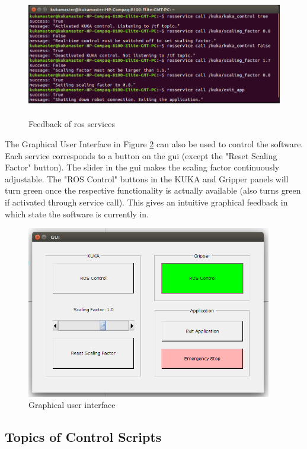 \documentclass[headsepline,footinclude=false,fontsize=11pt,paper=a4,listof=totoc,bibliography=totoc,BCOR=12mm,DIV=14]{scrbook}
\begin{document}
\begin{figure}[h]
    \centering
    \includegraphics[height=5.5cm]{figures/services}
    \caption{Feedback of \gls{ros} services}
    \label{fig:services}
\end{figure}

The Graphical User Interface in Figure \ref{fig:gui} can also be used to control the software. Each service corresponds to a button on the \gls{gui} (except the "Reset Scaling Factor" button). The slider in the \gls{gui} makes the scaling factor continuously adjustable. The "ROS Control" buttons in the KUKA and Gripper panels will turn green once the respective functionality is actually available (also turns green if activated through service call). This gives an intuitive graphical feedback in which state the software is currently in.

\begin{figure}[h]
    \centering
    \includegraphics[height=7.5cm]{figures/gui}
    \caption{Graphical user interface}
    \label{fig:gui}
\end{figure}

\newpage
\subsection{Topics of Control Scripts}
\end{document}
